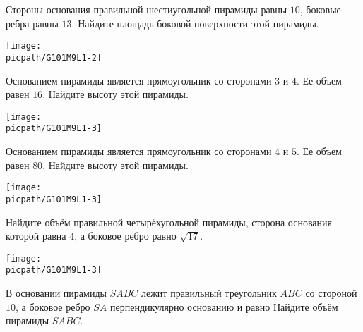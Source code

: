 \begin{class}[number=1]
\begin{listofex}
		\begin{minipage}[t]{\bodywidth}
			Стороны основания правильной шестиугольной пирамиды равны \(10\), боковые ребра равны \(13\). Найдите площадь боковой поверхности этой пирамиды.
		\end{minipage}
		\hspace{0.02\linewidth}
		\begin{minipage}[t]{\picwidth}
			\texttt{[image: \\picpath/G101M9L1-2]}
		\end{minipage}
		\item 
		\begin{minipage}[t]{\bodywidth}
			Основанием пирамиды является прямоугольник со сторонами \(3\) и \(4\). Ее объем равен \(16\). Найдите высоту этой пирамиды.
		\end{minipage}
		\hspace{0.02\linewidth}
		\begin{minipage}[t]{\picwidth}
			\texttt{[image: \\picpath/G101M9L1-3]}
		\end{minipage}
		\item 
		\begin{minipage}[t]{\bodywidth}
			Основанием пирамиды является прямоугольник со сторонами \(4\) и \(5\). Ее объем равен \(80\). Найдите высоту этой пирамиды.
		\end{minipage}
		\hspace{0.02\linewidth}
		\begin{minipage}[t]{\picwidth}
			\texttt{[image: \\picpath/G101M9L1-3]}
		\end{minipage}
		\item 
		\begin{minipage}[t]{\bodywidth}
			Найдите объём правильной четырёхугольной пирамиды, сторона основания которой равна \(4\), а боковое ребро равно \(\sqrt{17}\).
		\end{minipage}
		\hspace{0.02\linewidth}
		\begin{minipage}[t]{\picwidth}
			\texttt{[image: \\picpath/G101M9L1-3]}
		\end{minipage}
		\item 
		\begin{minipage}[t]{\bodywidth}
			В основании пирамиды \(SABC\) лежит правильный треугольник \(ABC\) со стороной \(10\), а боковое ребро \(SA\) перпендикулярно основанию и равно Найдите объём пирамиды \(SABC\).
		\end{minipage}

\end{listofex}
\end{class}
